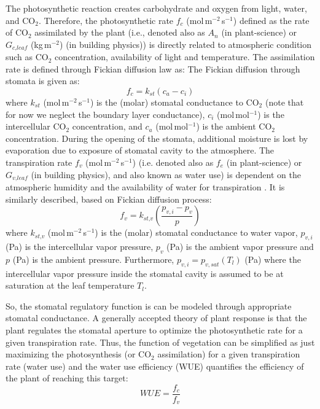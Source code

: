 The photosynthetic reaction creates carbohydrate and oxygen from light, water, and CO$_2$. Therefore, the photosynthetic rate $f_c$ (mol\,m$^{-2}$\,s$^{-1}$) defined as the rate of CO$_2$ assimilated by the plant (i.e., denoted also as $A_n$ (in plant-science) or $G_{\textit{c,leaf}}$ (kg\,m$^{-2}$) (in building physics)) is directly related to atmospheric condition such as CO$_2$ concentration, availability of light and temperature. The assimilation rate is defined through Fickian diffusion law as:
The Fickian diffusion through stomata is given as:
\begin{equation}
f_c = k_{\textit{st}} \left(c_a - c_i\right)
\label{eq:fickassim}
\end{equation}
where $k_{st}$ (mol\,m$^{-2}$\,s$^{-1}$) is the (molar) stomatal conductance to CO$_2$ (note that for now we neglect the boundary layer conductance), $c_i$ (mol\,mol$^{-1}$) is the intercellular CO$_2$ concentration, and $c_a$ (mol\,mol$^{-1}$) is the ambient CO$_2$ concentration. During the opening of the stomata, additional moisture is lost by evaporation due to exposure of stomatal cavity to the atmosphere. The transpiration rate $f_v$ (mol\,m$^{-2}$\,s$^{-1}$) (i.e. denoted also as $f_e$ (in plant-science) or $G_{\textit{v,leaf}}$ (in building physics), and also known as water use) is dependent on the atmospheric humidity and the availability of water for transpiration \citep{Ball1987,Leuning1995}. It is similarly described, based on Fickian diffusion process:
\begin{equation}
f_v = k_{\textit{st,v}} \left(\frac{p_{v,i} - p_v}{p}\right)
\label{eq:fv}
\end{equation}
where $k_{\textit{st,v}}$ (mol\,m$^{-2}$\,s$^{-1}$) is the (molar) stomatal conductance to water vapor, $p_{v,i}$ (Pa) is the intercellular vapor pressure, $p_v$ (Pa) is the ambient vapor pressure and $p$ (Pa) is the ambient pressure. Furthermore, $p_{v,i} = p_{v,sat}\left(T_l\right)$ (Pa) where the intercellular vapor pressure inside the stomatal cavity is assumed to be at saturation at the leaf temperature $T_l$. 


So, the stomatal regulatory function is can be modeled through appropriate stomatal conductance. A generally accepted theory of plant response is that the plant regulates the stomatal aperture to optimize the photosynthetic rate for a given transpiration rate. Thus, the function of vegetation can be simplified as just maximizing the photosynthesis (or CO$_2$ assimilation) for a given transpiration rate (water use) \citep{Medlyn2011} and the water use efficiency (WUE) quantifies the efficiency of the plant of reaching this target:
\begin{equation}
\textit{WUE} = \frac{f_c}{f_v}
\label{eq:wue}
\end{equation}


